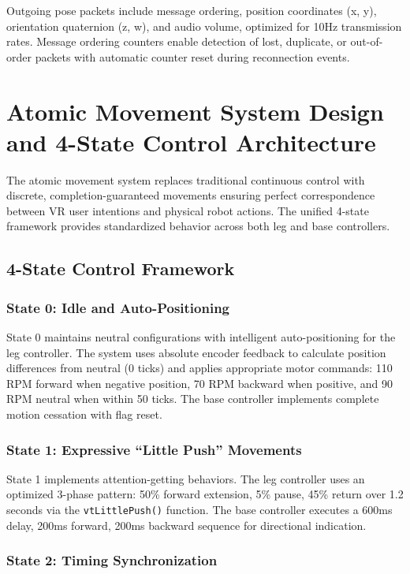 Outgoing pose packets include message ordering, position coordinates (x, y), orientation quaternion (z, w), and audio volume, optimized for 10Hz transmission rates. Message ordering counters enable detection of lost, duplicate, or out-of-order packets with automatic counter reset during reconnection events.

\section{Atomic Movement System Design and 4-State Control Architecture}

The atomic movement system replaces traditional continuous control with discrete, completion-guaranteed movements ensuring perfect correspondence between VR user intentions and physical robot actions. The unified 4-state framework provides standardized behavior across both leg and base controllers.

\subsection{4-State Control Framework}

\subsubsection{State 0: Idle and Auto-Positioning}

State 0 maintains neutral configurations with intelligent auto-positioning for the leg controller. The system uses absolute encoder feedback to calculate position differences from neutral (0 ticks) and applies appropriate motor commands: 110 RPM forward when negative position, 70 RPM backward when positive, and 90 RPM neutral when within 50 ticks. The base controller implements complete motion cessation with flag reset.

\subsubsection{State 1: Expressive ``Little Push'' Movements}

State 1 implements attention-getting behaviors. The leg controller uses an optimized 3-phase pattern: 50\% forward extension, 5\% pause, 45\% return over 1.2 seconds via the \texttt{vtLittlePush()} function. The base controller executes a 600ms delay, 200ms forward, 200ms backward sequence for directional indication.

\subsubsection{State 2: Timing Synchronization}

